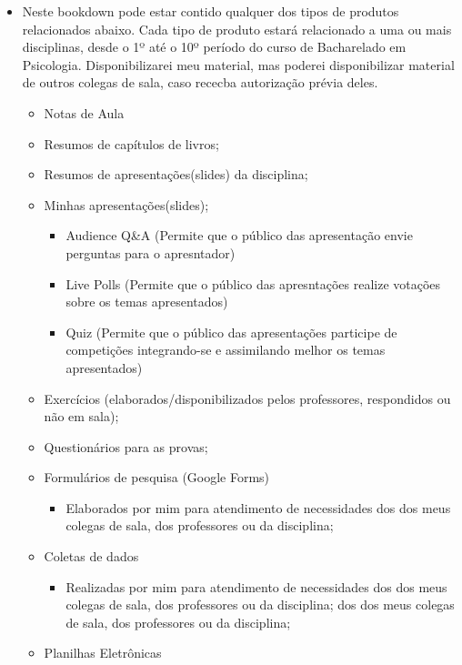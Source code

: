 \documentclass[
]{book}
\providecommand{\tightlist}{%
  \setlength{\itemsep}{0pt}\setlength{\parskip}{0pt}}
\begin{document}
\begin{itemize}
\tightlist
\item
  Neste bookdown pode estar contido qualquer dos tipos de produtos relacionados abaixo. Cada tipo de produto estará relacionado a uma ou mais disciplinas, desde o 1º até o 10º período do curso de Bacharelado em Psicologia. Disponibilizarei meu material, mas poderei disponibilizar material de outros colegas de sala, caso rececba autorização prévia deles.

  \begin{itemize}
  \tightlist
  \item
    Notas de Aula
  \item
    Resumos de capítulos de livros;
  \item
    Resumos de apresentações(slides) da disciplina;
  \item
    Minhas apresentações(slides);

    \begin{itemize}
    \tightlist
    \item
      Audience Q\&A (Permite que o público das apresentação envie perguntas para o apresntador)
    \item
      Live Polls (Permite que o público das apresntações realize votações sobre os temas apresentados)
    \item
      Quiz (Permite que o público das apresentações participe de competições integrando-se e assimilando melhor os temas apresentados)
    \end{itemize}
  \item
    Exercícios (elaborados/disponibilizados pelos professores, respondidos ou não em sala);
  \item
    Questionários para as provas;
  \item
    Formulários de pesquisa (Google Forms)

    \begin{itemize}
    \tightlist
    \item
      Elaborados por mim para atendimento de necessidades dos dos meus colegas de sala, dos professores ou da disciplina;
    \end{itemize}
  \item
    Coletas de dados

    \begin{itemize}
    \tightlist
    \item
      Realizadas por mim para atendimento de necessidades dos dos meus colegas de sala, dos professores ou da disciplina; dos dos meus colegas de sala, dos professores ou da disciplina;
    \end{itemize}
  \item
    Planilhas Eletrônicas


\end{itemize}
\end{itemize}
\end{document}
